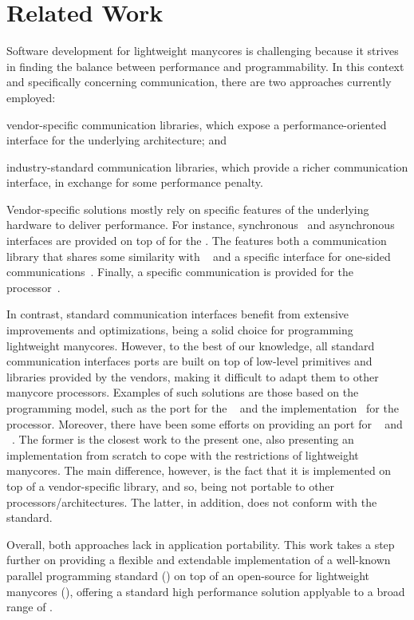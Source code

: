 \section{Related Work}
\label{sec:related-work}

	Software development for lightweight manycores is challenging
	because it strives in finding the balance between performance and
	programmability. In this context and specifically concerning
	communication, there are two approaches currently employed:
	\begin{enumerate*}[label=(\roman*)]
		\item vendor-specific communication libraries, which expose a
			performance-oriented interface for the underlying
			architecture; and 

		\item industry-standard communication libraries, which provide a
			richer communication interface, in exchange for some
			performance penalty.
	\end{enumerate*}

	Vendor-specific solutions mostly rely on specific features of the
	underlying hardware to deliver performance. For instance,
	synchronous~\cite{Wijngaart2011} and asynchronous~\cite{Clauss2011}
	interfaces are provided on top of \mpb for the \scc. The \mppa features
	both a communication library that shares some similarity
	with \posix~\cite{Dinechin2013-1} and a specific interface for one-sided
	communications~\cite{Hascoet2017}.
	Finally, a specific communication \api is provided for the \epiphany
	processor~\cite{Varghese2014}.

	In contrast, standard communication interfaces benefit from
	extensive improvements and optimizations, being a solid choice
	for programming lightweight manycores. However, to the best of our
	knowledge, all standard communication interfaces ports are built on
	top of low-level primitives and libraries provided by the vendors,
	making it difficult to adapt them to other
	manycore processors. Examples of such solutions are those based on
	the \pgas programming model, such as the \upc port for the
	\scc~\cite{Gamell2012} and the \openshmem implementation~\cite{Ross2016}
	for the \epiphany processor.  Moreover, there have been some efforts on
	providing an \mpi port for \mppa~\cite{Quan2015} and
	\epiphany~\cite{Richie2017}. The former is the closest work to the
	present one, also presenting an implementation from scratch to cope
	with the restrictions of lightweight manycores. The main difference,
	however, is the fact that it is implemented on top of a
	vendor-specific \ipc library, and so, being not portable to other
	processors/architectures. The latter, in addition, does not conform
	with the \mpi standard.

	Overall, both approaches lack in application
	portability. This work takes a step further on providing a
	flexible and extendable implementation of a well-known parallel
	programming standard (\mpi) on top of an open-source \os for
	lightweight manycores (\nanvix), offering a standard high
	performance solution applyable to a broad range of \lws.
